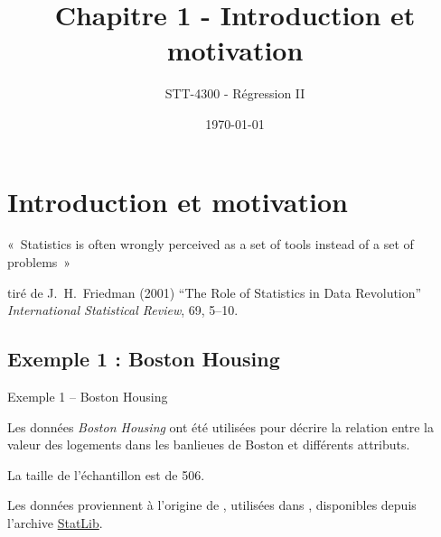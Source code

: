 \documentclass{BeamerTemplate}
\title{Chapitre 1 - Introduction et motivation}
\subtitle{STT-4300 - Régression II}
\date{\today}
\begin{document}
\begin{refsection}

\begin{frame}[t]
\titlepage
\end{frame}

\section{Introduction et motivation}

\begin{frame}{}
\begin{center}
{\color{blue}«~Statistics is often wrongly perceived as a set of tools instead of a set of problems~»}
\end{center}

\bigskip
\bigskip

tiré de J.~H.~Friedman (2001) ``The Role of Statistics in Data Revolution'' \textit{International Statistical Review}, 69, 5--10.
\end{frame}

\subsection{Exemple 1 : Boston Housing}

\begin{frame}{Exemple 1 -- Boston Housing}

Les données \textit{Boston Housing} ont été utilisées pour décrire la relation entre la valeur des logements dans les banlieues de Boston et différents attributs.

\bigskip

La taille de l'échantillon est de 506.

\bigskip

Les données proviennent à l'origine de , utilisées dans
, disponibles depuis l'archive \href{https://lib.stat.cmu.edu/datasets/boston}{StatLib}.


\end{frame}

\begin{frame}{}


\end{frame}
\end{refsection}
\end{document}
